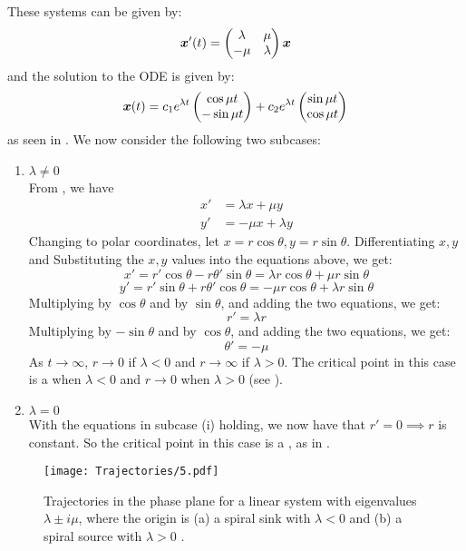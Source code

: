 \begin{itemize}
	These systems can be given by:
	\begin{equation}\label{3.6}
		\bm{x}'(t) = \begin{pmatrix} \lambda & \mu \\ -\mu & \lambda\end{pmatrix} \bm{x}
	\end{equation} 
	and the solution to the ODE is given by:
	\[
	\bm{x}(t) = c_1 e^{\lambda t} \begin{pmatrix}\cos{\mu t} \\ -\sin{\mu t}\end{pmatrix} + c_2 e^{\lambda t} \begin{pmatrix}\sin{\mu t} \\ \cos{\mu t}\end{pmatrix} 
	\]
	as seen in . We now consider the following two subcases: 
	\begin{enumerate}[label=(\roman*)]
		\item $\lambda \neq 0$ \\ 
		From , we have 
		\begin{align*}
			x' &= \lambda x + \mu y \\
			y' &= -\mu x + \lambda y
		\end{align*}
		Changing to polar coordinates, let $x= r \cos{\theta}, y = r \sin{\theta}$. Differentiating $x,y$ and Substituting the $x,y$ values into the equations above, we get: 
		\begin{equation}\label{eq3.7}
			x' = r'\cos{\theta} - r\theta'\sin{\theta} = \lambda r \cos{\theta} + \mu r\sin{\theta}
		\end{equation}
		\begin{equation}\label{eq3.8}
			y' = r'\sin{\theta} + r\theta'\cos{\theta} = -\mu r \cos{\theta} + \lambda r\sin{\theta}
		\end{equation}
		Multiplying  by $\cos{\theta}$ and  by $\sin{\theta}$, and adding the two equations, we get: 
		\[
		r' = \lambda r
		\]
		Multiplying  by $-\sin{\theta}$ and  by $\cos{\theta}$, and adding the two equations, we get: 
		\[
		\theta' = -\mu
		\]
		As $t \rightarrow \infty$, $r \rightarrow 0$ if $\lambda<0$ and $r \rightarrow \infty$ if $\lambda>0$. 
		The critical point in this case is a  when $\lambda<0$ and  $r \rightarrow 0$ when $\lambda>0$ (see ).
		
		\item $\lambda = 0$ \\
		With the equations in subcase (i) holding, we now have that $r'=0 \implies r$ is constant. So the critical point in this case is a , as in .
	\end{enumerate}
	
	\begin{figure}[H]
		\centering
		\texttt{[image: Trajectories/5.pdf]}
		\caption{Trajectories in the phase plane for a linear system with eigenvalues $\lambda \pm i\mu$, where the origin is (a) a spiral sink with $\lambda <0$ and (b) a spiral source with $\lambda >0$ \cite[Figure 9.1.5]{boyce}.}
		\label{fig:trajectory5}
	\end{figure}
	

\end{itemize}
